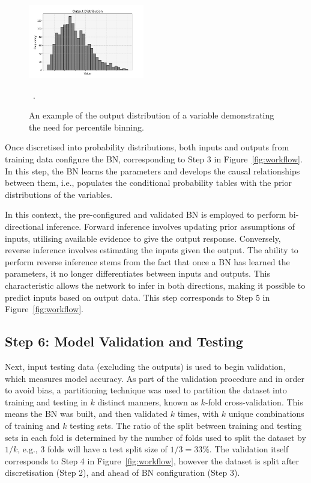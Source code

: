 \documentclass[journal]{IEEEtran}
\begin{document}
\begin{figure}[ht]
    \centering
    \includegraphics[width=0.45\textwidth]{figures/output_dist_eg.png}
    \caption{\small An example of the output distribution of a variable demonstrating the need for percentile binning.}~\label{fig:output_dist_eg}.
\end{figure}

Once discretised into probability distributions, both inputs and outputs from training data configure the BN, corresponding to Step 3 in Figure~\ref{fig:workflow}. In this step, the BN learns the parameters and develops the causal relationships between them, i.e., populates the conditional probability tables with the prior distributions of the variables. 

In this context, the pre-configured and validated BN is employed to perform bi-directional inference. Forward inference involves updating prior assumptions of inputs, utilising available evidence to give the output response. Conversely, reverse inference involves estimating the inputs given the output. The ability to perform reverse inference stems from the fact that once a BN has learned the parameters, it no longer differentiates between inputs and outputs. This characteristic allows the network to infer in both directions, making it possible to predict inputs based on output data. This step corresponds to Step 5 in Figure~\ref{fig:workflow}.

\subsection{\textbf{Step 6}: Model Validation and Testing}\label{sec:meth_validation} 

Next, input testing data (excluding the outputs) is used to begin validation, which measures model accuracy. As part of the validation procedure and in order to avoid bias, a partitioning technique was used to partition the dataset into training and testing in $k$ distinct manners, known as $k$-fold cross-validation. This means the BN was built, and then validated $k$ times, with $k$ unique combinations of training and $k$ testing sets. The ratio of the split between training and testing sets in each fold is determined by the number of folds used to split the dataset by $1/k$, e.g., 3 folds will have a test split size of $1/3 = 33\%$. The validation itself corresponds to Step 4 in Figure~\ref{fig:workflow}, however the dataset is split after discretisation (Step 2), and ahead of BN configuration (Step 3). 
\end{document}
